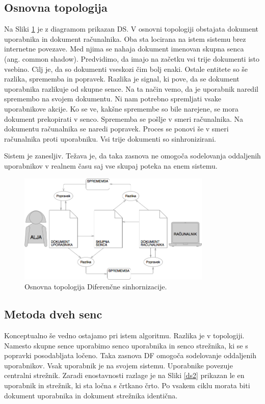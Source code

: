 \documentclass[a4paper, 12pt, twoside]{book}
\begin{document}
\subsection{Osnovna topologija}

Na Sliki \ref{ds1} je z diagramom prikazan DS. V osnovni topologiji obstajata dokument uporabnika in dokument računalnika. Oba sta locirana na istem sistemu brez internetne povezave. Med njima se nahaja dokument imenovan skupna senca (ang. common shadow). Predvidimo, da imajo na začetku vsi trije dokumenti isto vsebino. Cilj je, da so dokumenti vseskozi čim bolj enaki. Ostale entitete so še razlika, sprememba in popravek. Razlika je signal, ki pove, da se dokument uporabnika razlikuje od skupne sence. Na ta način vemo, da je uporabnik naredil spremembo na svojem dokumentu. Ni nam potrebno spremljati vsake uporabnikove akcije. Ko se ve, kakšne spremembe so bile narejene, se mora dokument prekopirati v senco. Sprememba se pošlje v smeri računalnika. Na dokumentu računalnika se naredi popravek. Proces se ponovi še v smeri računalnika proti uporabniku. Vsi trije dokumenti so sinhronizirani.

Sistem je zanesljiv. Težava je, da taka zasnova ne omogoča sodelovanja oddaljenih uporabnikov v realnem času saj vse skupaj poteka na enem sistemu.

\begin{figure}[placement h]
\begin{center}
\includegraphics[width=9.2cm]{ds1.png}
\end{center}
\caption{Osnovna topologija Diferenčne sinhornizacije.}
\label{ds1}
\end{figure}

\subsection{Metoda dveh senc}

Konceptualno še vedno ostajamo pri istem algoritmu. Razlika je v topologiji. Namesto skupne sence uporabimo senco uporabnika in senco strežnika, ki se s popravki posodabljata ločeno. Taka zasnova DF omogoča sodelovanje oddaljenih uporabnikov. Vsak uporabnik je na svojem sistemu. Uporabnike povezuje centralni strežnik. Zaradi enostavnosti razlage je na Sliki \ref{ds2} prikazan le en uporabnik in strežnik, ki sta ločna s črtkano črto. Po vsakem ciklu morata biti dokument uporabnika in dokument strežnika identična.
\end{document}
